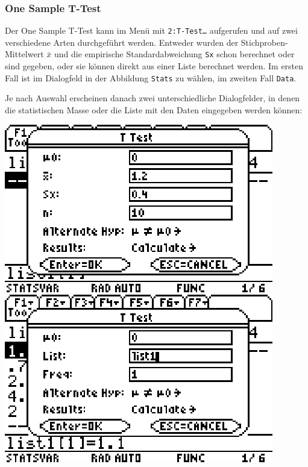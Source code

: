 \documentclass[a4paper,11pt,notitlepage,halfparskip,headsepline,normalheadings,twoside]{scrartcl}
\newlength{\tikey}
\newcommand{\keystroke}[1]{\settowidth{\tikey}{\scriptsize #1}\psframebox[framearc=0.2]{\parbox{\tikey}{\scriptsize\textsf{#1}}}}
\begin{document}
\subsubsection{One Sample T-Test}
\begin{window}
Der One Sample T-Test kann im Menü \keystroke{F6} mit \texttt{2:T-Test\ldots}
aufgerufen und auf zwei verschiedene Arten durchgeführt werden. Entweder wurden der
Stichproben-Mittelwert \texttt{$\bar{x}$} und die empirische Standardabweichung
\texttt{Sx} schon berechnet oder sind gegeben, oder sie können direkt aus einer
Liste berechnet werden. Im ersten Fall ist im Dialogfeld in der Abbildung
\texttt{Stats} zu wählen, im zweiten Fall \texttt{Data}.
\end{window}

Je nach Auswahl erscheinen danach zwei unterschiedliche Dialogfelder, in denen
die statistischen Masse oder die Liste mit den Daten eingegeben werden können:

\begin{center}
\includegraphics{eps/tstats.eps}
\includegraphics{eps/tdata.eps}
\end{center}
\end{document}
